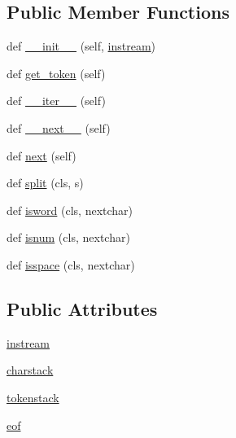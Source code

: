 \subsection*{Public Member Functions}
\begin{DoxyCompactItemize}
\item 
def \hyperlink{classdateutil_1_1parser_1_1__parser_1_1__timelex_adbec1eae4ed44ca1b4a9691e4c1b0847}{\+\_\+\+\_\+init\+\_\+\+\_\+} (self, \hyperlink{classdateutil_1_1parser_1_1__parser_1_1__timelex_aa7cbf8b8e26256ec2c0186aa701df278}{instream})
\item 
def \hyperlink{classdateutil_1_1parser_1_1__parser_1_1__timelex_a319c47d014fa821a845960ed9c492bf0}{get\+\_\+token} (self)
\item 
def \hyperlink{classdateutil_1_1parser_1_1__parser_1_1__timelex_a3c8e6127e9623d4bd46bb13715df69ac}{\+\_\+\+\_\+iter\+\_\+\+\_\+} (self)
\item 
def \hyperlink{classdateutil_1_1parser_1_1__parser_1_1__timelex_a986265e1db0a09d7de04902d6fbee799}{\+\_\+\+\_\+next\+\_\+\+\_\+} (self)
\item 
def \hyperlink{classdateutil_1_1parser_1_1__parser_1_1__timelex_a218b366c085b859e05300dabce2aba14}{next} (self)
\item 
def \hyperlink{classdateutil_1_1parser_1_1__parser_1_1__timelex_aefeb1572d65b1030e4b37cef3d7c2e24}{split} (cls, s)
\item 
def \hyperlink{classdateutil_1_1parser_1_1__parser_1_1__timelex_ac79bd788e45a79a4d1a04d5d61ab015e}{isword} (cls, nextchar)
\item 
def \hyperlink{classdateutil_1_1parser_1_1__parser_1_1__timelex_a7cc667a2754b9718a07ba6b6b0c44fcb}{isnum} (cls, nextchar)
\item 
def \hyperlink{classdateutil_1_1parser_1_1__parser_1_1__timelex_ad1f7dea7c868d4558cb2cf98e3703bc8}{isspace} (cls, nextchar)
\end{DoxyCompactItemize}
\subsection*{Public Attributes}
\begin{DoxyCompactItemize}
\item 
\hyperlink{classdateutil_1_1parser_1_1__parser_1_1__timelex_aa7cbf8b8e26256ec2c0186aa701df278}{instream}
\item 
\hyperlink{classdateutil_1_1parser_1_1__parser_1_1__timelex_ad7399328737d6145a2867b35408c460f}{charstack}
\item 
\hyperlink{classdateutil_1_1parser_1_1__parser_1_1__timelex_af10b9463d37ac42cf2fa2e8de0e88897}{tokenstack}
\item 
\hyperlink{classdateutil_1_1parser_1_1__parser_1_1__timelex_af26df957bc5ca32fb6ec5e5f0351efe4}{eof}
\end{DoxyCompactItemize}


